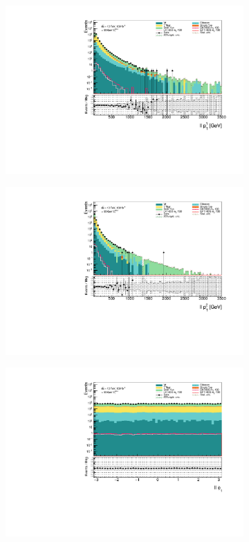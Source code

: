 \documentclass[12pt, a4paper]{book}
\begin{document}
\begin{figure}[!ht]
    \centering
    \begin{subfigure}[b]{0.49\textwidth}
        \centering
        \includegraphics[width=\textwidth]{pt1_ll.pdf}
    \end{subfigure}
    \hfill
    \begin{subfigure}[b]{0.49\textwidth}
        \centering
        \includegraphics[width=\textwidth]{pt2_ll.pdf}
    \end{subfigure}
    \begin{subfigure}[b]{0.49\textwidth}
        \centering
        \includegraphics[width=\textwidth]{phi1_ll.pdf}

\end{subfigure}
\end{figure}
\end{document}
